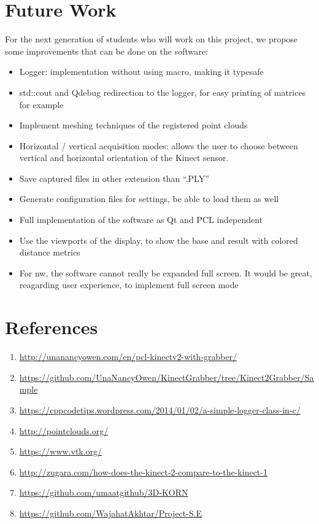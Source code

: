 \documentclass[aps,letterpaper,11pt]{revtex4}
\begin{document}
\section{Future Work}
For the next generation of students who will work on this project, we propose some improvements that can be done on the software:\par
\begin{itemize}
\item Logger: implementation without using macro, making it typesafe
\item std::cout and Qdebug redirection to the logger, for easy printing of matrices for example
\item Implement meshing techniques of the registered point clouds
\item Horizontal / vertical acquisition modes: allows the user to choose between vertical and horizontal orientation of the Kinect sensor.
\item Save captured files in other extension than “.PLY”
\item Generate configuration files for settings, be able to load them as well
\item Full implementation of the software as Qt and PCL independent
\item Use the viewports of the display, to show the base and result with colored distance metrics
\item For nw, the software cannot really be expanded full screen. It would be great, reagarding user experience, to implement full screen mode
\end{itemize}


\pagebreak

\section{References}
\begin{enumerate}
\item \url{http://unanancyowen.com/en/pcl-kinectv2-with-grabber/}
\item \url{https://github.com/UnaNancyOwen/KinectGrabber/tree/Kinect2Grabber/Sample}
\item \url{https://cppcodetips.wordpress.com/2014/01/02/a-simple-logger-class-in-c/}
\item \url{http://pointclouds.org/}
\item \url{https://www.vtk.org/}
\item \url{http://zugara.com/how-does-the-kinect-2-compare-to-the-kinect-1}
\item \url{https://github.com/umaatgithub/3D-KORN}
\item \url{https://github.com/WajahatAkhtar/Project-S.E}
\end{enumerate}
\end{document}
